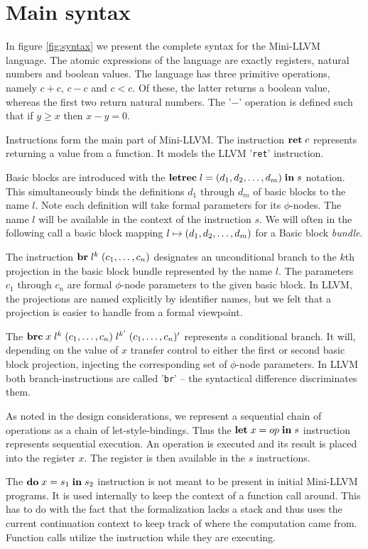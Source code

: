 \documentclass[a4paper, oneside, 10pt, draft]{memoir}
\begin{document}
\section{Main syntax}

In figure \ref{fig:syntax} we present the complete syntax for the
Mini-LLVM language. The atomic expressions of the language are exactly
registers, natural numbers and boolean values. The language has three
primitive operations, namely $c + c$, $c - c$ and $c < c$. Of these,
the latter returns a boolean value, whereas the first two return
natural numbers. The '$-$' operation is defined such that if $y \geq
x$ then $x - y = 0$.

Instructions form the main part of Mini-LLVM. The instruction
$\mathbf{ret} \; c$ represents returning a value from a function. It models the
LLVM '\texttt{ret}' instruction.

Basic blocks are introduced with the $\mathbf{letrec} \; l = (d_1, d_2, \dotsc, d_m) \; \mathbf{in} \; s$
notation. This simultaneously binds the definitions $d_1$ through
$d_m$ of basic blocks to the name $l$. Note each definition will take
formal parameters for its $\phi$-nodes. The name $l$ will be
available in the context of the instruction $s$. We will often in the
following call a basic block mapping $l \mapsto (d_1, d_2, \dotsc, d_m)$
for a Basic block \emph{bundle}.

The instruction $\mathbf{br} \; l^k \; (c_1, \dotsc, c_n)$ designates an
unconditional branch to the $k$th projection in the basic block bundle
represented by the name $l$. The parameters $c_1$ through $c_n$ are
formal $\phi$-node parameters to the given basic block. In LLVM, the
projections are named explicitly by identifier names, but we felt that
a projection is easier to handle from a formal viewpoint.

The $\mathbf{brc} \; x \; l^k \; (c_1, \dotsc, c_n) \; l^{k'} \; (c_1, \dotsc, c_n)'$ represents a conditional
branch. It will, depending on the value of $x$ transfer control to
either the first or second basic block projection, injecting the
corresponding set of $\phi$-node parameters. In LLVM both
branch-instructions are called '\texttt{br}' -- the syntactical
difference discriminates them.

As noted in the design considerations, we represent a sequential chain
of operations as a chain of let-style-bindings. Thus the
$\mathbf{let} \; x = op \; \mathbf{in} \; s$ instruction represents sequential execution. An
operation is executed and its result is placed into the register
$x$. The register is then available in the $s$ instructions.

The $\mathbf{do} \; x = s_1 \; \mathbf{in} \; s_2$ instruction is not meant to be present in
initial Mini-LLVM programs. It is used internally to keep the context
of a function call around. This has to do with the fact that the
formalization lacks a stack and thus uses the current continuation
context to keep track of where the computation came from. Function
calls utilize the instruction while they are executing.
\end{document}
